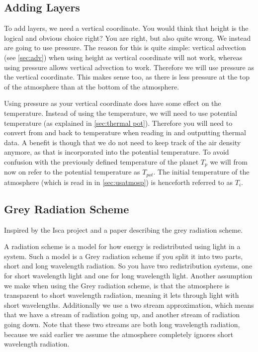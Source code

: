 \subsection{Adding Layers}
To add layers, we need a vertical coordinate. You would think that height is the logical and obvious choice right? You are right, but also quite wrong. We instead are going to use pressure. The 
reason for this is quite simple: vertical advection (see \autoref{sec:adv}) when using height as vertical coordinate will not work, whereas using pressure allows vertical advection to work.
Therefore we will use pressure as the vertical coordinate. This makes sense too, as there is less pressure at the top of the atmosphere than at the bottom of the atmosphere.

Using pressure as your vertical coordinate does have some effect on the temperature. Instead of using the temperature, we will need to use potential temperature (as explained in 
\autoref{sec:thermal pot}). Therefore you will need to convert from and back to temperature when reading in and outputting thermal data. A benefit is though that we do not need to keep track 
of the air density anymore, as that is incorporated into the potential temperature. To avoid confusion with the previously defined temperature of the planet $T_p$ we will from now on refer to 
the potential temperature as $T_{pot}$. The initial temperature of the atmosphere (which is read in in \autoref{sec:usatmosp}) is henceforth referred to as $T_i$.

\subsection{Grey Radiation Scheme}
Inspired by the Isca project \cite{isca} and a paper describing the grey radiation scheme\cite{greyRad}.

A radiation scheme is a model for how energy is redistributed using light in a system. Such a model is a Grey radiation scheme if you split it into two parts, short and long wavelength radiation.
So you have two redistribution systems, one for short wavelength light and one for long wavelength light. Another assumption we make when using the Grey radiation scheme, is that the atmosphere 
is transparent to short wavelength radiation, meaning it lets through light with short wavelengths. Additionally we use a two stream approximation, which means that we have a stream of radiation
going up, and another stream of radiation going down. Note that these two streams are both long wavelength radiation, because we said earlier we assume the atmosphere completely ignores short 
wavelength radiation.

